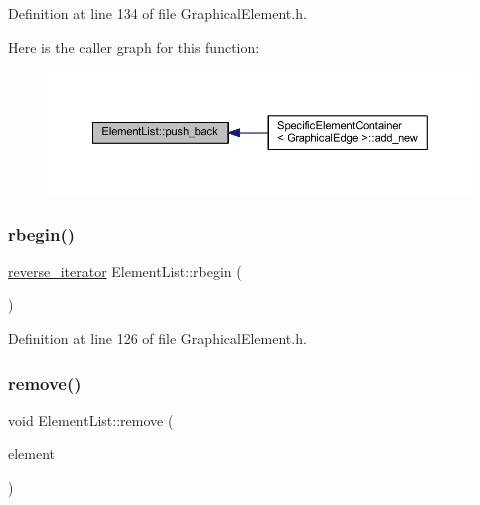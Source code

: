 Definition at line 134 of file Graphical\+Element.\+h.

Here is the caller graph for this function\+:
\nopagebreak
\begin{figure}[H]
\begin{center}
\leavevmode
\includegraphics[width=350pt]{class_element_list_a0c7327348fe7c7d8ad032ad4a71eed39_icgraph}
\end{center}
\end{figure}
\mbox{\label{class_element_list_a827726e626667715db21ad21f1b7d6fa}} 
\subsubsection{\texorpdfstring{rbegin()}{rbegin()}}
{\footnotesize\ttfamily \hyperlink{class_element_list_a5a94d1e25a0deeb3f222dc12fa115174}{reverse\+\_\+iterator} Element\+List\+::rbegin (\begin{DoxyParamCaption}{ }\end{DoxyParamCaption})\hspace{0.3cm}{\ttfamily [inline]}}



Definition at line 126 of file Graphical\+Element.\+h.

\mbox{\label{class_element_list_a06b71e09b7ca85b416effbdac076ec49}} 
\subsubsection{\texorpdfstring{remove()}{remove()}}
{\footnotesize\ttfamily void Element\+List\+::remove (\begin{DoxyParamCaption}\item[{\hyperlink{class_graphical_element}{Graphical\+Element} $\ast$}]{element }\end{DoxyParamCaption})\hspace{0.3cm}{\ttfamily [inline]}}



